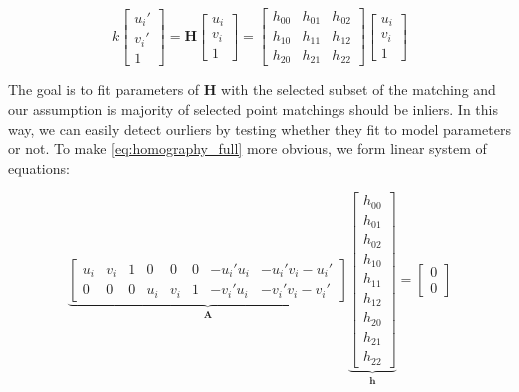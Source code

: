 \documentclass[a4paper]{report}
\numberwithin{figure}{section}
\begin{document}
\begin{equation}
  k
  \begin{bmatrix}
    u_i' \\ v_i' \\1
  \end{bmatrix}
  =
  \mathbf{H}
  \begin{bmatrix}
    u_i \\ v_i \\1
  \end{bmatrix}
  =
  \begin{bmatrix}
    h_{00} & h_{01} & h_{02} \\
    h_{10} & h_{11} & h_{12} \\
    h_{20} & h_{21} & h_{22}
    \end{bmatrix}
  \begin{bmatrix}
      u_i \\ v_i \\1
    \end{bmatrix}
  \end{equation}\label{eq:homography_full}

The goal is to fit parameters of $\mathbf{H}$ with the selected subset of 
the matching and our assumption is majority of selected point matchings 
should be inliers. In this way, we can easily detect ourliers by testing 
whether they fit to model parameters or not. To make \ref{eq:homography_full} 
more obvious, we form linear system of equations:

\begin{equation}
\underbrace{
\begin{bmatrix}
  u_i & v_i & 1 & 0 & 0 & 0 & -u_i'u_i & -u_i'v_i -u_i'\\
  0 & 0 & 0 & u_i & v_i & 1 & -v_i'u_i & -v_i'v_i -v_i'
\end{bmatrix}}_{\mathbf{A}}
\underbrace{
\begin{bmatrix}
    h_{00} \\ h_{01} \\ h_{02} \\ h_{10} \\ h_{11} \\ h_{12} \\ h_{20} \\ h_{21} \\ h_{22}
\end{bmatrix}}_{\mathbf{h}}
= 
\begin{bmatrix}
  0\\0
\end{bmatrix}
\end{equation}
\end{document}
